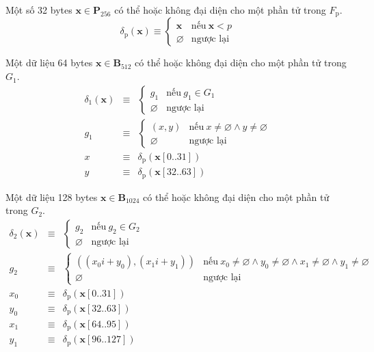 \documentclass[9pt,oneside]{amsart}
\begin{document}
Một số 32 bytes $\mathbf{x}\in\mathbf{P}_{256}$ có thể hoặc không đại diện cho một phần tử trong $F_{\mathrm{p}}$.
\begin{equation}
\delta_{\mathrm{p}}(\mathbf{x})\equiv\begin{cases}
\mathbf{x}&\text{nếu}\ \mathbf{x}<p\\
\varnothing&\text{ngược lại}
\end{cases}
\end{equation}

Một dữ liệu 64 bytes $\mathbf{x}\in\mathbf{B}_{512}$ có thể hoặc không đại diện cho một phần tử trong $G_1$.
\begin{eqnarray}
\delta_1(\mathbf{x})&\equiv&\begin{cases}
g_1&\text{nếu}\ g_1\in G_1\\
\varnothing&\text{ngược lại}
\end{cases}\\
g_1&\equiv&\begin{cases}
(x,y)&\text{nếu}\ x\neq\varnothing\wedge y\neq\varnothing\\
\varnothing&\text{ngược lại}
\end{cases}\\
x&\equiv&\delta_{\mathrm{p}}(\mathbf{x}[0..31])\\
y&\equiv&\delta_{\mathrm{p}}(\mathbf{x}[32..63])
\end{eqnarray}

Một dữ liệu 128 bytes $\mathbf{x}\in\mathbf{B}_{1024}$ có thể hoặc không đại diện cho một phần tử trong $G_2$.
\begin{eqnarray}
\delta_2(\mathbf{x})&\equiv&\begin{cases}
g_2&\text{nếu}\ g_2\in G_2\\
\varnothing&\text{ngược lại}
\end{cases}\\
g_2&\equiv&\begin{cases}
((x_0i+y_0),(x_1i+y_1))&\text{nếu}\ x_0\neq\varnothing\wedge y_0\neq\varnothing\wedge x_1\neq\varnothing\wedge y_1\neq\varnothing\\
\varnothing&\text{ngược lại}
\end{cases}\\
x_0&\equiv&\delta_{\mathrm{p}}(\mathbf{x}[0..31])\\
y_0&\equiv&\delta_{\mathrm{p}}(\mathbf{x}[32..63])\\
x_1&\equiv&\delta_{\mathrm{p}}(\mathbf{x}[64..95])\\
y_1&\equiv&\delta_{\mathrm{p}}(\mathbf{x}[96..127])
\end{eqnarray}
\end{document}
